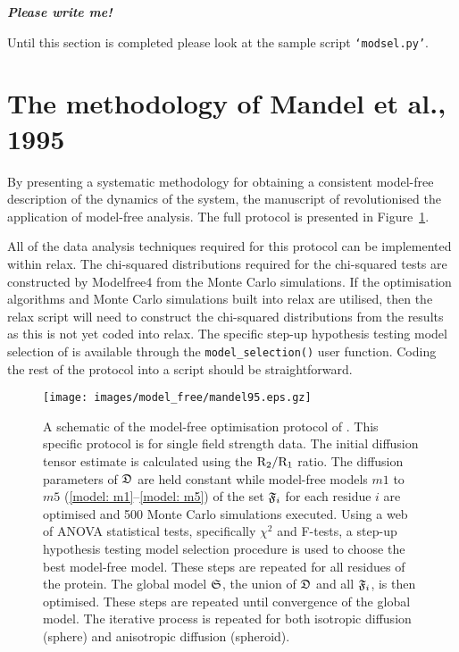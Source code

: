 \textbf{\textit{Please write me!}}

Until this section is completed please look at the sample script \texttt{`modsel.py'}.




\section{The methodology of Mandel et al., 1995}

By presenting a systematic methodology for obtaining a consistent model-free description of the dynamics of the system, the manuscript of \citet{Mandel95} revolutionised the application of model-free analysis.  The full protocol is presented in Figure~\ref{fig: Mandel et al.}.

All of the data analysis techniques required for this protocol can be implemented within relax.  The chi-squared distributions required for the chi-squared tests are constructed by Modelfree4 from the Monte Carlo simulations.  If the optimisation algorithms and Monte Carlo simulations built into relax are utilised, then the relax script will need to construct the chi-squared distributions from the results as this is not yet coded into relax.  The specific step-up hypothesis testing model selection of \citet{Mandel95} is available through the \texttt{model\_selection()} user function.  Coding the rest of the protocol into a script should be straightforward.



\begin{figure}
\centerline{\texttt{[image: images/model\_free/mandel95.eps.gz]}}
\caption[A schematic of the model-free optimisation protocol of Mandel et al., 1995]{A schematic of the model-free optimisation protocol of \citet{Mandel95}.  This specific protocol is for single field strength data.  The initial diffusion tensor estimate is calculated using the $\mathrm{R}_2/\mathrm{R}_1$ ratio.  The diffusion parameters of $\mathfrak{D}$ are held constant while model-free models $m1$ to $m5$ (\ref{model: m1}--\ref{model: m5}) of the set $\mathfrak{F}_i$ for each residue $i$ are optimised and 500 Monte Carlo simulations executed.  Using a web of ANOVA statistical tests, specifically $\chi^2$ and F-tests, a step-up hypothesis testing model selection procedure is used to choose the best model-free model.  These steps are repeated for all residues of the protein.  The global model $\mathfrak{S}$, the union of $\mathfrak{D}$ and all $\mathfrak{F}_i$, is then optimised.  These steps are repeated until convergence of the global model.  The iterative process is repeated for both isotropic diffusion (sphere) and anisotropic diffusion (spheroid).} \label{fig: Mandel et al.}
\end{figure}



